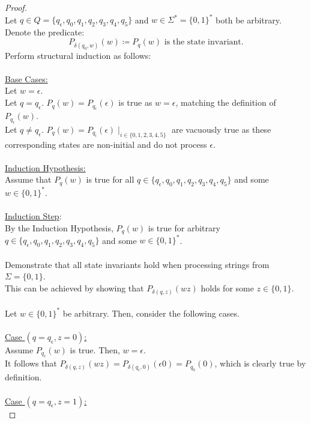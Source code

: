 \documentclass[12pt]{article}
\begin{document}
\begin{proof}
    \\
    Let $q \in Q = \{q_{\epsilon}, q_0, q_1, q_2, q_3, q_4, q_5\}$ and $w \in \Sigma^* = \{0, 1\}^*$ both be arbitrary. \\
    Denote the predicate:
    \[
        P_{\delta(q_0, w)}(w) \coloneqq P_q(w) \text{ is the state invariant.}
    \]
    Perform structural induction as follows: \\
    \\
    \underline{Base Cases:} \\
    Let $w = \epsilon$. \\
    Let $q = q_{\epsilon}$. $P_q(w) = P_{q_{\epsilon}}(\epsilon)$ is true as $w = \epsilon$, matching the definition of $P_{q_{\epsilon}}(w)$. \\
    Let $q \neq q_{\epsilon}$. $P_q(w) = P_{q_i}(\epsilon) \mid_{i \in \{0, 1, 2, 3, 4, 5\}}$ are vacuously true as these corresponding states are non-initial and do not process $\epsilon$. \\
    \\
    \underline{Induction Hypothesis:} \\
    Assume that $P_q(w)$ is true for all $q \in \{q_{\epsilon}, q_0, q_1, q_2, q_3, q_4, q_5\}$ and some $w \in \{0, 1\}^*$. \\
    \\
    \underline{Induction Step}: \\
    By the Induction Hypothesis, $P_q(w)$ is true for arbitrary $q \in \{q_{\epsilon}, q_0, q_1, q_2, q_3, q_4, q_5\}$ and some $w \in \{0, 1\}^*$. \\
    \\
    Demonstrate that all state invariants hold when processing strings from $\Sigma = \{0, 1\}$. \\
    This can be achieved by showing that $P_{\delta(q, z)}(wz)$ holds for some $z \in \{0, 1\}$. \\
    \\
    Let $w \in \{0, 1\}^*$ be arbitrary. Then, consider the following cases. \\
    \\
    \underline{Case $(q = q_{\epsilon}, z = 0)$:} \\
    Assume $P_{q_{\epsilon}}(w)$ is true. Then, $w = \epsilon$. \\
    It follows that $P_{\delta(q, z)}(wz) = P_{\delta(q_{\epsilon}, 0)}(\epsilon 0) = P_{q_0}(0)$, which is clearly true by definition. \\
    \\
    \underline{Case $(q = q_{\epsilon}, z = 1)$:} \\

\end{proof}
\end{document}
